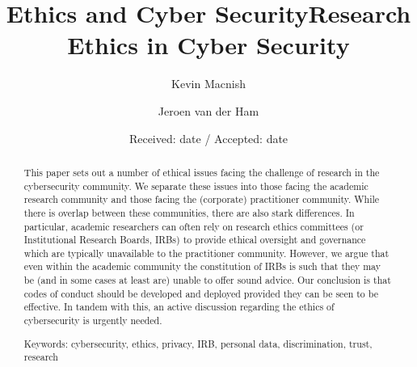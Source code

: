 \documentclass{svjour3}                     %
\begin{document}
\title{Ethics and Cyber Security}


\author{Kevin Macnish         \and
        Jeroen van der Ham}



\date{Received: date / Accepted: date}


\maketitle

\title{Research Ethics in Cyber Security}

\begin{abstract}
This paper sets out a number of ethical issues facing the challenge of research in the cybersecurity community.  We separate these issues into those facing the academic research community and those facing the (corporate) practitioner community.  While there is overlap between these communities, there are also stark differences.  In particular, academic researchers can often rely on research ethics committees (or Institutional Research Boards, IRBs) to provide ethical oversight and governance which are typically unavailable to the practitioner community.  However, we argue that even within the academic community the constitution of IRBs is such that they may be (and in some cases at least are) unable to offer sound advice. Our conclusion is that codes of conduct should be developed and deployed provided they can be seen to be effective. In tandem with this, an active discussion regarding the ethics of cybersecurity is urgently needed.

Keywords: cybersecurity, ethics, privacy, IRB, personal data, discrimination, trust, research

\end{abstract}
\end{document}
